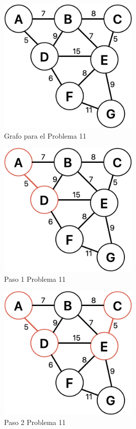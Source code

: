 \documentclass[12pt]{article}  %
\begin{document}
\begin{figure}[H]
\centering
\caption{Grafo para el Problema 11}
\label{fig:GrafoProb11}
\includegraphics[width=0.6\textwidth]{assets/GrafoProb11.png}
\end{figure}

\begin{figure}[H]
\centering
\caption{Paso 1 Problema 11}
\label{fig:paso1Prob11}
\includegraphics[width=0.6\textwidth]{assets/paso1Prob11.png}
\end{figure}

\begin{figure}[H]
\centering
\caption{Paso 2 Problema 11}
\label{fig:paso2Prob11}
\includegraphics[width=0.6\textwidth]{assets/paso2Prob11.png}
\end{figure}
\end{document}
